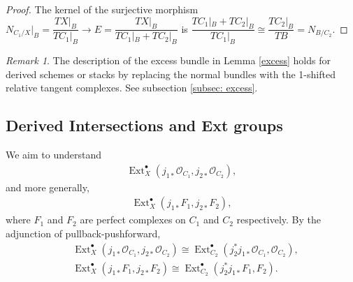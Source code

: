 \documentclass[12pt]{amsart}
\theoremstyle{definition}
\theoremstyle{remark}
\newtheorem{remark}[theorem]{Remark}
\numberwithin{equation}{section}
\newcommand{\shO}{\mathcal{O}}
\newcommand{\Ext}{\operatorname{Ext}}
\newcommand{\arw}{\longrightarrow}
\begin{document}
\begin{proof}
    The kernel of the surjective morphism $N_{C_1/X}|_B=\dfrac{TX|_B}{TC_1|_B}\arw  E=\dfrac{TX|_B}{TC_1|_B+TC_2|_B}$ is $\dfrac{TC_1|_B+TC_2|_B}{TC_1|_B}\cong\dfrac{TC_2|_B}{TB}=N_{B/C_2}$.    
\end{proof}
\begin{remark}
    The description of the excess bundle in Lemma \ref{excess} holds for derived schemes or stacks by replacing the normal bundles with the 1-shifted relative tangent complexes. See subsection \ref{subsec: excess}.
\end{remark}

\subsection{Derived Intersections and Ext groups}\label{subsec: derint}
We aim to understand 
\begin{align}
    \Ext_X^{\bullet}(j_{1*}\shO_{C_1}, j_{2*}\shO_{C_2}),
    \end{align}
and more generally, 
\begin{align}
    \Ext_X^{\bullet}(j_{1*}F_1, j_{2*}F_2),
    \end{align}
where $F_1$ and $F_2$ are perfect complexes on $C_1$ and $C_2$ respectively. 
By the adjunction of pullback-pushforward,      \begin{align}\label{ext}
    & \Ext_X^{\bullet}(j_{1*}\shO_{C_1}, j_{2*}\shO_{C_2})\cong \Ext_{C_2}^{\bullet}(j_2^{*}j_{1*}\shO_{C_1}, \shO_{C_2}),\\ 
    & \Ext_X^{\bullet}(j_{1*}F_1, j_{2*}F_2)\cong \Ext_{C_2}^{\bullet}(j_2^*j_{1*}F_1, F_2). \label{ext'}
\end{align}
\end{document}
